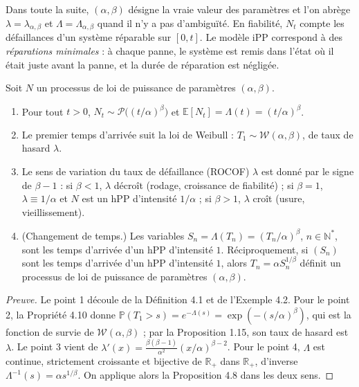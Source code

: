 Dans toute la suite, $(\alpha,\beta)$ désigne la vraie valeur des paramètres et l'on abrège $\lambda=\lambda_{\alpha,\beta}$ et $\Lambda=\Lambda_{\alpha,\beta}$ quand il n'y a pas d'ambiguïté. En fiabilité, $N_t$ compte les défaillances d'un système réparable sur $[0,t]$. Le modèle iPP correspond à des \emph{réparations minimales} : à chaque panne, le système est remis dans l'état où il était juste avant la panne, et la durée de réparation est négligée.

\begin{proposition}\label{prop:proprietes}
Soit $N$ un processus de loi de puissance de paramètres $(\alpha,\beta)$.
\begin{enumerate}
\item Pour tout $t>0$, $N_t\sim\mathcal{P}\big((t/\alpha)^\beta\big)$ et $\mathbb{E}[N_t]=\Lambda(t)=(t/\alpha)^\beta$.
\item Le premier temps d'arrivée suit la loi de Weibull : $T_1\sim\mathcal{W}(\alpha,\beta)$, de taux de hasard $\lambda$.
\item Le sens de variation du taux de défaillance (ROCOF) $\lambda$ est donné par le signe de $\beta-1$ :
 si $\beta<1$, $\lambda$ décroît (rodage, croissance de fiabilité) ;
 si $\beta=1$, $\lambda\equiv1/\alpha$ et $N$ est un hPP d'intensité $1/\alpha$ ;
 si $\beta>1$, $\lambda$ croît (usure, vieillissement).
\item (Changement de temps.) Les variables $S_n=\Lambda(T_n)=(T_n/\alpha)^\beta$, $n\in\mathbb{N}^*$, sont les temps d'arrivée d'un hPP d'intensité $1$. Réciproquement, si $(S_n)$ sont les temps d'arrivée d'un hPP d'intensité $1$, alors $T_n=\alpha S_n^{1/\beta}$ définit un processus de loi de puissance de paramètres $(\alpha,\beta)$.
\end{enumerate}
\end{proposition}

\begin{proof}[Preuve]
Le point 1 découle de la Définition 4.1 et de l'Exemple 4.2. Pour le point 2, la Propriété 4.10 donne $\mathbb{P}(T_1>s)=e^{-\Lambda(s)}=\exp(-(s/\alpha)^\beta)$, qui est la fonction de survie de $\mathcal{W}(\alpha,\beta)$ ; par la Proposition 1.15, son taux de hasard est $\lambda$. Le point 3 vient de $\lambda'(x)=\frac{\beta(\beta-1)}{\alpha^2}(x/\alpha)^{\beta-2}$. Pour le point 4, $\Lambda$ est continue, strictement croissante et bijective de $\mathbb{R}_+$ dans $\mathbb{R}_+$, d'inverse $\Lambda^{-1}(s)=\alpha s^{1/\beta}$. On applique alors la Proposition 4.8 dans les deux sens.
\end{proof}

